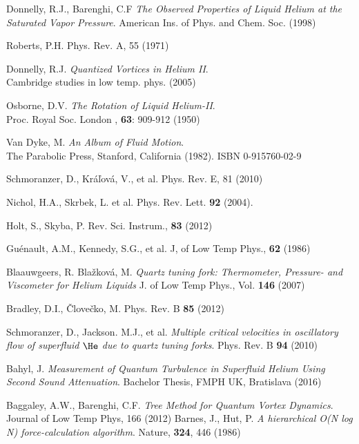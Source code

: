 \begin{thebibliography}{99}
	{\sc Donnelly, R.J., Barenghi, C.F}
	\emph{The Observed Properties of Liquid Helium at the Saturated Vapor Pressure}. American Ins. of Phys. and Chem. Soc. (1998)

	{\sc Roberts, P.H.}
	\emph{} Phys. Rev. A, 55 (1971)

	{\sc Donnelly, R.J.}
	\emph{Quantized Vortices in Helium II}.\\
	Cambridge studies in low temp. phys. (2005)

	{\sc Osborne, D.V.}
	\emph{The Rotation of Liquid Helium-II}.\\
	Proc. Royal Soc. London , \textbf{63}: 909-912 (1950)

	{\sc Van Dyke, M.}
	\emph{An Album of Fluid Motion}.\\
	The Parabolic Press, Stanford, California (1982). ISBN 0-915760-02-9

	{\sc Schmoranzer, D., Kráľová, V., et al.}
	\emph{}	Phys. Rev. E, 81 (2010)

	{\sc Nichol, H.A., Skrbek, L. et al.}
	\emph{} Phys. Rev. Lett. \textbf{92} (2004).


	{\sc Holt, S., Skyba, P.}
	\emph{} Rev. Sci. Instrum., \textbf{83} (2012)

	{\sc Guénault, A.M., Kennedy, S.G., et al.}
	\emph{} J, of Low Temp Phys., \textbf{62} (1986)

	{\sc Blaauwgeers, R. Blažková, M.} 
	\emph{Quartz tuning fork: Thermometer, Pressure- and Viscometer for Helium Liquids} J. of Low Temp Phys., Vol. \textbf{146} (2007)

	{\sc Bradley, D.I., Človečko, M.} 
	\emph{} Phys. Rev. B \textbf{85} (2012)

	{\sc Schmoranzer, D., Jackson. M.J., et al.}
	\emph{Multiple critical velocities in oscillatory flow of superfluid $\He$ due to quartz tuning forks}.
	Phys. Rev. B \textbf{94} (2010)

	{\sc Bahyl, J.}
	\emph{Measurement of Quantum Turbulence in Superfluid Helium Using Second Sound Attenuation}.
	Bachelor Thesis, FMPH UK, Bratislava (2016)




















	{\sc Baggaley, A.W., Barenghi, C.F.}
	\emph{Tree Method for Quantum Vortex Dynamics}. Journal of Low Temp Phys, 166 (2012)
	{\sc Barnes, J., Hut, P.}
	\emph{A hierarchical O(N log N) force-calculation algorithm}. Nature, \textbf{324}, 446 (1986)

\end{thebibliography}
